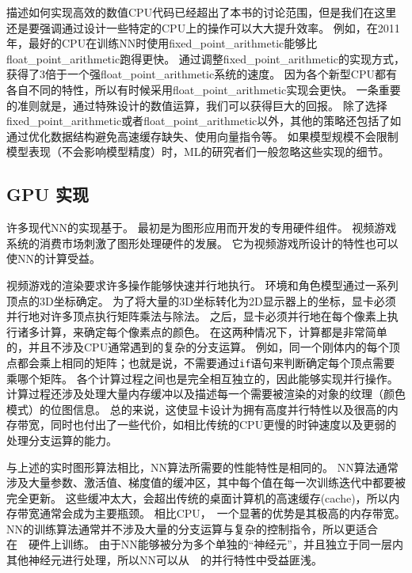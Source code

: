 描述如何实现高效的数值CPU代码已经超出了本书的讨论范围，但是我们在这里还是要强调通过设计一些特定的CPU上的操作可以大大提升效率。
例如，在2011年，最好的CPU在训练\gls{NN}时使用\gls{fixed_point_arithmetic}能够比\gls{float_point_arithmetic}跑得更快。
通过调整\gls{fixed_point_arithmetic}的实现方式，\citet{Vanhoucke-et-al-2011}获得了3倍于一个强\gls{float_point_arithmetic}系统的速度。
因为各个新型CPU都有各自不同的特性，所以有时候采用\gls{float_point_arithmetic}实现会更快。
一条重要的准则就是，通过特殊设计的数值运算，我们可以获得巨大的回报。
除了选择\gls{fixed_point_arithmetic}或者\gls{float_point_arithmetic}以外，其他的策略还包括了如通过优化数据结构避免高速缓存缺失、使用向量指令等。
如果模型规模不会限制模型表现（不会影响模型精度）时，\gls{ML}的研究者们一般忽略这些实现的细节。

\subsection{GPU 实现}
\label{sec:gpu_implementations}

许多现代\gls{NN}的实现基于。
最初是为图形应用而开发的专用硬件组件。
视频游戏系统的消费市场刺激了图形处理硬件的发展。
它为视频游戏所设计的特性也可以使\gls{NN}的计算受益。

视频游戏的渲染要求许多操作能够快速并行地执行。
环境和角色模型通过一系列顶点的3D坐标确定。
为了将大量的3D坐标转化为2D显示器上的坐标，显卡必须并行地对许多顶点执行矩阵乘法与除法。
之后，显卡必须并行地在每个像素上执行诸多计算，来确定每个像素点的颜色。
在这两种情况下，计算都是非常简单的，并且不涉及CPU通常遇到的复杂的分支运算。
例如，同一个刚体内的每个顶点都会乘上相同的矩阵；也就是说，不需要通过{\tt if}语句来判断确定每个顶点需要乘哪个矩阵。
各个计算过程之间也是完全相互独立的，因此能够实现并行操作。
计算过程还涉及处理大量内存缓冲以及描述每一个需要被渲染的对象的纹理（颜色模式）的位图信息。
总的来说，这使显卡设计为拥有高度并行特性以及很高的内存带宽，同时也付出了一些代价，如相比传统的CPU更慢的时钟速度以及更弱的处理分支运算的能力。


与上述的实时图形算法相比，\gls{NN}算法所需要的性能特性是相同的。
\gls{NN}算法通常涉及大量参数、激活值、梯度值的缓冲区，其中每个值在每一次训练迭代中都要被完全更新。
这些缓冲太大，会超出传统的桌面计算机的高速缓存(cache)，所以内存带宽通常会成为主要瓶颈。
相比CPU，~一个显著的优势是其极高的内存带宽。
\gls{NN}的训练算法通常并不涉及大量的分支运算与复杂的控制指令，所以更适合在~~硬件上训练。
由于\gls{NN}能够被分为多个单独的``神经元''，并且独立于同一层内其他神经元进行处理，所以\gls{NN}可以从~~的并行特性中受益匪浅。


